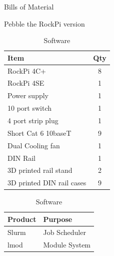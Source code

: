 \documentclass[final]{beamer}
\newlength{\colwidth}
\begin{document}
\begin{frame}[t]
\begin{columns}[t]
\begin{column}{\colwidth}
				\begin{block}{Bills of Material}
					\begin{table}
						\parbox{.45\linewidth}{
							\centering
							\caption{Pebble the RockPi version}				
							\begin{tabular}{l c}
								\textbf{Item} & \textbf{Qty} \\
								\hline
								RockPi 4C+ & 8 \\
								RockPi 4SE & 1 \\
								Power supply & 1 \\
								10 port switch & 1 \\
								4 port strip plug & 1 \\
								Short Cat 6 10baseT & 9 \\
								Dual Cooling fan & 1 \\
								DIN Rail & 1 \\
								3D printed rail stand & 2 \\
								3D printed DIN rail cases & 9 \\
							\end{tabular}
						}
						\parbox{.45\linewidth}{
							\centering
							\caption{Software}				
							\begin{tabular}{l|l}
								\textbf{Product} & {Purpose}\\
								\hline
								Slurm & Job Scheduler \\
								lmod & Module System \\

\end{tabular}}
\end{table}
\end{block}
\end{column}
\end{columns}
\end{frame}
\end{document}

